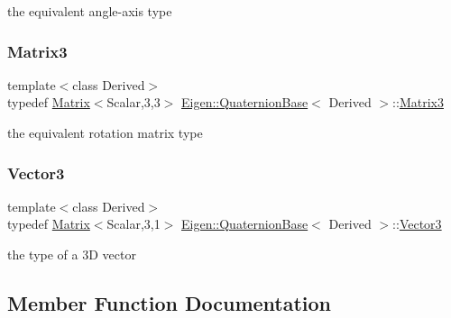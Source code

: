 the equivalent angle-\/axis type \mbox{\label{class_eigen_1_1_quaternion_base_ac3972e6cb0f56cccbe9e3946a7e494f8}} 
\subsubsection{\texorpdfstring{Matrix3}{Matrix3}}
{\footnotesize\ttfamily template$<$class Derived$>$ \\
typedef \mbox{\hyperlink{class_eigen_1_1_matrix}{Matrix}}$<$Scalar,3,3$>$ \mbox{\hyperlink{class_eigen_1_1_quaternion_base}{Eigen\+::\+Quaternion\+Base}}$<$ Derived $>$\+::\mbox{\hyperlink{class_eigen_1_1_quaternion_base_ac3972e6cb0f56cccbe9e3946a7e494f8}{Matrix3}}}

the equivalent rotation matrix type \mbox{\label{class_eigen_1_1_quaternion_base_a974c0529d55983b0b3a6d99a8466f331}} 
\subsubsection{\texorpdfstring{Vector3}{Vector3}}
{\footnotesize\ttfamily template$<$class Derived$>$ \\
typedef \mbox{\hyperlink{class_eigen_1_1_matrix}{Matrix}}$<$Scalar,3,1$>$ \mbox{\hyperlink{class_eigen_1_1_quaternion_base}{Eigen\+::\+Quaternion\+Base}}$<$ Derived $>$\+::\mbox{\hyperlink{class_eigen_1_1_quaternion_base_a974c0529d55983b0b3a6d99a8466f331}{Vector3}}}

the type of a 3D vector 

\subsection{Member Function Documentation}
\mbox{\label{class_eigen_1_1_quaternion_base_a03896e1e743aae2c18a0146086cef983}} 
